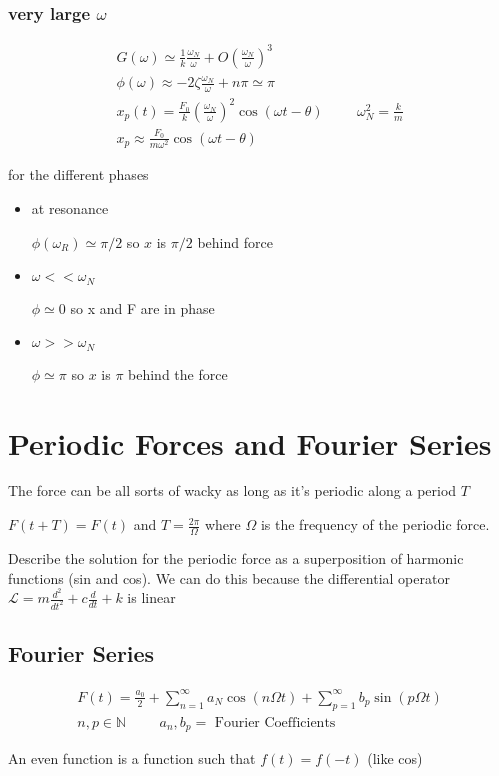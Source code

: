 \documentclass[fleqn]{report}
\newcommand{\hp}{\hspace{1cm}}
\newcommand{\equations} [1] {
\begin{gather*}
#1
\end{gather*}
}
\begin{document}
\subsection{very large $\omega$}
\equations{
    G(\omega) \simeq 
    \frac{1}{k} \frac{\omega_N}{\omega} + O(\frac{\omega_N}{\omega})^3
    \\
    \phi(\omega) \approx - 2 \zeta \frac{\omega_N}{\omega} + n \pi \simeq \pi
    \\
    x_p(t) = 
    \frac{F_0}{k} (\frac{\omega_N}{\omega})^2 \cos(\omega t - \theta)
    \hp 
    \omega_N^2 = \frac{k}{m}
    \\
    x_p \approx \frac{F_0}{m \omega^2} \cos(\omega t - \theta)
}

for the different phases 
\begin{itemize}
    \item 
    at resonance 

    $\phi(\omega_R) \simeq \pi/2$ so $x$ is $\pi/2$ behind force 
    \item 
    $\omega << \omega_N$

    $\phi \simeq 0$ so
    x and F are in phase 
    \item
    $\omega >> \omega_N$
    
    $\phi \simeq \pi$ so $x$ is $\pi$ behind the force 
\end{itemize}


\chapter{Periodic Forces and Fourier Series}
The force can be all sorts of wacky as long as it's periodic along a period $T$

$F(t + T) = F(t)$ and $T = \frac{2 \pi}{\Omega}$ where $\Omega$ is the frequency of 
the periodic force. 

Describe the solution for the periodic force as a superposition of 
harmonic functions (sin and cos). 
We can do this because the differential operator 
$\mathcal{L} = m \frac{d^2}{dt^2} + c \frac{d}{dt} + k$ is linear 

\section{Fourier Series}
\equations{
    F(t) = \frac{a_0}{2} + \sum^{\infty}_{n = 1} a_N \cos(n \Omega t) + 
    \sum^{\infty}_{p = 1} b_p \sin(p \Omega t)
    \\
    n, p \in \mathbb{N}
    \hp 
    a_n, b_p = \textrm{ Fourier Coefficients}
}
An even function is a function such that $f(t) = f(-t)$ (like cos)
\end{document}
